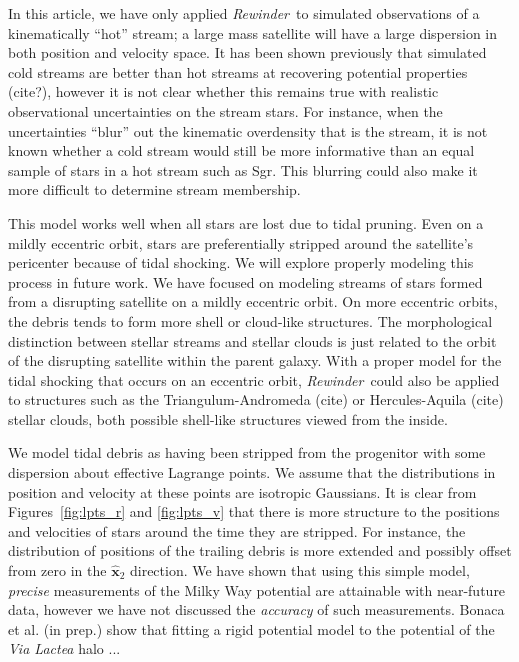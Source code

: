 \documentclass[letterpaper,12pt,preprint]{aastex}
\newcommand{\project}[1]{\textsl{#1}}
\newcommand{\bs}{\boldsymbol}
\newcommand{\rewinder}{\emph{Rewinder}}
\begin{document}
In this article, we have only applied \rewinder\ to simulated observations of a kinematically ``hot'' stream; a large mass satellite will have a large dispersion in both position and velocity space. It has been shown previously that simulated cold streams are better than hot streams at recovering potential properties (cite?), however it is not clear whether this remains true with realistic observational uncertainties on the stream stars. For instance, when the uncertainties ``blur'' out the kinematic overdensity that is the stream, it is not known whether a cold stream would still be more informative than an equal sample of stars in a hot stream such as Sgr. This blurring could also make it more difficult to determine stream membership.

This model works well when all stars are lost due to tidal pruning. Even on a mildly eccentric orbit, stars are preferentially stripped around the satellite's pericenter because of tidal shocking. We will explore properly modeling this process in future work. We have focused on modeling streams of stars formed from a disrupting satellite on a mildly eccentric orbit. On more eccentric orbits, the debris tends to form more shell or cloud-like structures. The morphological distinction between stellar streams and stellar clouds is just related to the orbit of the disrupting satellite within the parent galaxy. With a proper model for the tidal shocking that occurs on an eccentric orbit, \rewinder\ could also be applied to structures such as the Triangulum-Andromeda (cite) or Hercules-Aquila (cite) stellar clouds, both possible shell-like structures viewed from the inside. 

We model tidal debris as having been stripped from the progenitor with some dispersion about effective Lagrange points. We assume that the distributions in position and velocity at these points are isotropic Gaussians. It is clear from Figures~\ref{fig:lpts_r} and \ref{fig:lpts_v} that there is more structure to the positions and velocities of stars around the time they are stripped. For instance, the distribution of positions of the trailing debris is more extended and possibly offset from zero in the $\hat{\bs{x}}_2$ direction. We have shown that using this simple model, \emph{precise} measurements of the Milky Way potential are attainable with near-future data, however we have not discussed the \emph{accuracy} of such measurements. Bonaca et al. (in prep.) show that fitting a rigid potential model to the potential of the \project{Via Lactea} halo ... %
  
\end{document}
